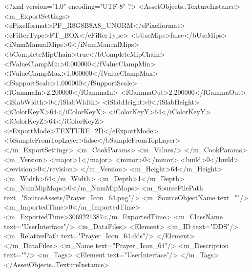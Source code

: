<?xml version="1.0" encoding="UTF-8" ?>
<AssetObjects..TextureInstance>
	<m_ExportSettings>
		<ePixelformat>PF_R8G8B8A8_UNORM</ePixelformat>
		<eFilterType>FT_BOX</eFilterType>
		<bUseMips>false</bUseMips>
		<iNumManualMips>0</iNumManualMips>
		<bCompleteMipChain>true</bCompleteMipChain>
		<fValueClampMin>0.000000</fValueClampMin>
		<fValueClampMax>1.000000</fValueClampMax>
		<fSupportScale>1.000000</fSupportScale>
		<fGammaIn>2.200000</fGammaIn>
		<fGammaOut>2.200000</fGammaOut>
		<iSlabWidth>0</iSlabWidth>
		<iSlabHeight>0</iSlabHeight>
		<iColorKeyX>64</iColorKeyX>
		<iColorKeyY>64</iColorKeyY>
		<iColorKeyZ>64</iColorKeyZ>
		<eExportMode>TEXTURE_2D</eExportMode>
		<bSampleFromTopLayer>false</bSampleFromTopLayer>
	</m_ExportSettings>
	<m_CookParams>
		<m_Values/>
	</m_CookParams>
	<m_Version>
		<major>1</major>
		<minor>0</minor>
		<build>0</build>
		<revision>0</revision>
	</m_Version>
	<m_Height>64</m_Height>
	<m_Width>64</m_Width>
	<m_Depth>1</m_Depth>
	<m_NumMipMaps>0</m_NumMipMaps>
	<m_SourceFilePath text="SourceAssets/Prayer_Icon_64.png"/>
	<m_SourceObjectName text=""/>
	<m_ImportedTime>0</m_ImportedTime>
	<m_ExportedTime>3069221387</m_ExportedTime>
	<m_ClassName text="UserInterface"/>
	<m_DataFiles>
		<Element>
			<m_ID text="DDS"/>
			<m_RelativePath text="Prayer_Icon_64.dds"/>
		</Element>
	</m_DataFiles>
	<m_Name text="Prayer_Icon_64"/>
	<m_Description text=""/>
	<m_Tags>
		<Element text="UserInterface"/>
	</m_Tags>
</AssetObjects..TextureInstance>
